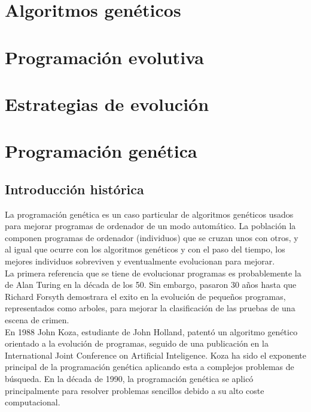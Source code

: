 \documentclass[12pt]{article} \usepackage[utf8x]{inputenc}
\begin{document}
\section{Algoritmos genéticos}

\section{Programación evolutiva}

\section{Estrategias de evolución}

\section{Programación genética}


\subsection{Introducción histórica} 

La programación genética es un caso particular de algoritmos genéticos usados para mejorar programas de ordenador de un modo automático. La población la componen programas de  ordenador (individuos) que se cruzan unos con otros, y al igual que ocurre con los algoritmos genéticos y con el paso del tiempo, los mejores individuos sobreviven y eventualmente evolucionan para mejorar. \\

La primera referencia que se tiene de evolucionar programas es probablemente la de Alan Turing en la década de los 50. Sin embargo, pasaron 30 años hasta que Richard Forsyth demostrara el exito en la evolución de pequeños programas, representados como arboles, para mejorar la clasificación de las pruebas de una escena de crimen.\\

En 1988 John Koza, estudiante de John Holland, patentó un algoritmo genético orientado a la evolución de programas, seguido de una publicación en la International Joint Conference on Artificial Inteligence. Koza ha sido el exponente principal de la programación genética aplicando esta a complejos problemas de búsqueda.
En la década de 1990, la programación genética se aplicó principalmente para resolver problemas sencillos debido a su alto coste computacional.\\
\end{document}
